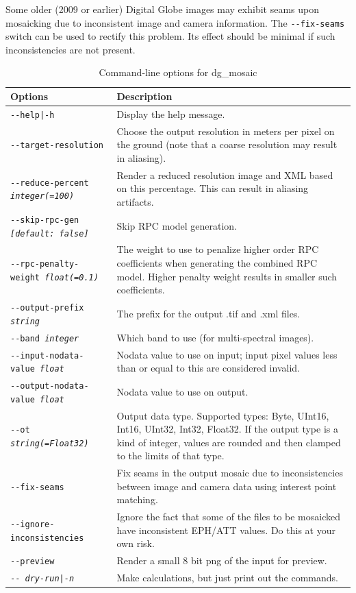 Some older (2009 or earlier) Digital Globe images may exhibit seams upon mosaicking
due to inconsistent image and camera information. The \texttt{-\/-fix-seams} switch
can be used to rectify this problem. Its effect should be minimal if such inconsistencies
are not present.

\begin{longtable}{|l|p{10cm}|}
\caption{Command-line options for dg\_mosaic}
\label{tbl:dgmosaic}
\endfirsthead
\endhead
\endfoot
\endlastfoot
\hline
Options & Description \\ \hline \hline
\texttt{-\/-help|-h} & Display the help message.\\ \hline
\texttt{-\/-target-resolution} &
Choose the output resolution in meters per pixel on the ground (note that a coarse resolution may result in aliasing). \\ \hline
\texttt{-\/-reduce-percent \textit{integer(=100)}} &
Render a reduced resolution image and XML based on this percentage. This can result in aliasing artifacts. \\ \hline
\texttt{-\/-skip-rpc-gen \textit{[default: false]}} &
Skip RPC model generation.\\ \hline
\texttt{-\/-rpc-penalty-weight \textit{float(=0.1)}} &
The weight to use to penalize higher order RPC coefficients when generating the combined RPC model. Higher penalty weight results in smaller such coefficients.\\ \hline
\texttt{-\/-output-prefix \textit{string}} & The prefix for the output .tif and .xml files. \\ \hline
\texttt{-\/-band \textit{integer}} & Which band to use (for multi-spectral images). \\ \hline
\texttt{-\/-input-nodata-value \textit{float}} & Nodata value to use on input; input pixel values less than or equal to this are considered invalid. \\ \hline
\texttt{-\/-output-nodata-value \textit{float}} & Nodata value to use on output. \\ \hline

\texttt{-\/-ot \textit{string(=Float32)}} & Output data type. Supported types: Byte, UInt16, Int16, UInt32, Int32, Float32. If the output type is a kind of integer, values are rounded and then clamped to the limits of that type. \\ \hline

\texttt{-\/-fix-seams} & Fix seams in the output mosaic due to inconsistencies between image and camera data using interest point matching. \\ \hline

\texttt{-\/-ignore-inconsistencies} & Ignore the fact that some of the files to be mosaicked have inconsistent EPH/ATT values. Do this at your own risk. \\ \hline

\texttt{-\/-preview } & Render a small 8 bit png of the input for preview. \\ \hline
\texttt{-\/- \textit{dry-run|-n}} & Make calculations, but just print out the commands. \\ \hline
\end{longtable}

